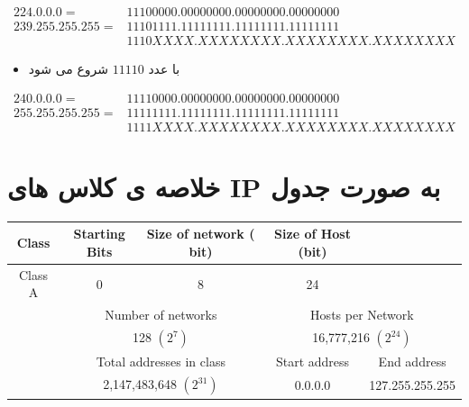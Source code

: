 \documentclass[12pt]{book}
\begin{document}
\begin{align*}
224.  0.  0.  0 = &11100000.00000000.00000000.00000000 \\
239.255.255.255 = &11101111.11111111.11111111.11111111 \\
                  &1110XXXX.XXXXXXXX.XXXXXXXX.XXXXXXXX
\end{align*}






\begin{itemize}
	\item {} با عدد $11110$ شروع می شود 
\end{itemize}

\begin{align*}
240.  0.  0.  0 = &11110000.00000000.00000000.00000000 \\
255.255.255.255 = &11111111.11111111.11111111.11111111 \\
                  &1111XXXX.XXXXXXXX.XXXXXXXX.XXXXXXXX
\end{align*}






\section{خلاصه ی کلاس های IP به صورت جدول}

\begin{latin}
\begin{center}
  \bgroup
  \def\arraystretch{1.5}%
  \begin{tabular}{ c  c  c  c  c    }
    Class & Starting Bits & Size of network ( bit) & Size of Host (bit) & \\
    \hline
    Class A & 0 & 8 & 24  & \\ \hline
   & \multicolumn{2}{c}{Number of networks} & \multicolumn{2}{c}{Hosts per Network}   \\ \hline
   & \multicolumn{2}{c}{128 $(2^{7})$} & \multicolumn{2}{c}{16,777,216 $(2^{24})$} \\ \hline
   & \multicolumn{2}{c}{Total addresses in class}  & Start address & End address   \\ \hline
   & \multicolumn{2}{c}{2,147,483,648 $(2^{31})$} & 0.0.0.0 & 	127.255.255.255  \\ \hline
  \end{tabular}
  \egroup
\end{center}
\end{latin}
\end{document}
